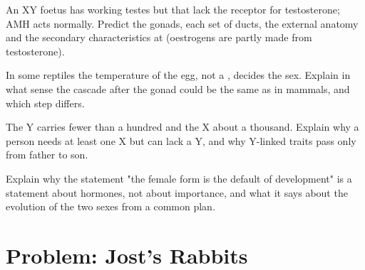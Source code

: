 \begin{exercise}[$\star\star\star$]\label{exo:g11:becoming-male-female:12}
An XY foetus has working testes but  that lack the receptor for
testosterone; AMH acts normally. Predict the gonads, each set of
ducts, the external anatomy and the secondary characteristics at
 (oestrogens are partly made from testosterone).
\end{exercise}

\begin{exercise}[$\star\star\star$]\label{exo:g11:becoming-male-female:13}
In some reptiles the temperature of the egg, not a ,
decides the sex. Explain in what sense the cascade after the gonad
could be the same as in mammals, and which step differs.
\end{exercise}

\begin{exercise}[$\star\star\star$]\label{exo:g11:becoming-male-female:14}
The Y  carries fewer than a hundred  and the X about a
thousand. Explain why a person needs at least one X but can lack a Y,
and why Y-linked traits pass only from father to son.
\end{exercise}

\begin{exercise}[$\star\star\star$]\label{exo:g11:becoming-male-female:15}
Explain why the statement "the female form is the default of
development" is a statement about hormones, not about importance,
and what it says about the evolution of the two sexes from a common
plan.
\end{exercise}

\section{Problem: Jost's Rabbits}

